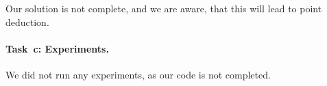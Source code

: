 Our solution is not complete, and we are aware, that this will lead to point deduction. 

\paragraph{Task~c: Experiments.}
We did not run any experiments, as our code is not completed. 

%
%
%


